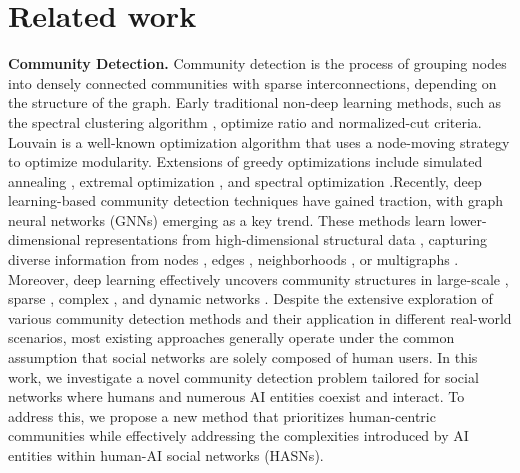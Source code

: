 \section{Related work}
\label{sec:related_work}

\noindent\textbf{Community Detection.} Community detection is the process of grouping nodes into densely connected communities with sparse interconnections, depending on the structure of the graph. Early traditional non-deep learning methods, such as the spectral clustering algorithm \cite{amini2013pseudo}, optimize ratio and normalized-cut criteria. Louvain \cite{blondel2008fast} is a well-known optimization algorithm that uses a node-moving strategy to optimize modularity. Extensions of greedy optimizations include simulated annealing \cite{kirkpatrick1983optimization}, extremal optimization \cite{boettcher2002optimization}, and spectral optimization \cite{newman2013spectral}.Recently, deep learning-based community detection techniques \cite{su2022comprehensive}\cite{lecun2015deep} have gained traction, with graph neural networks (GNNs) emerging as a key trend. These methods learn lower-dimensional representations from high-dimensional structural data \cite{khoshraftar2024survey} \cite{tsitsulin2023graph}, capturing diverse information from nodes \cite{ge2024unsupervised}, edges \cite{chikwendu2023comprehensive}, neighborhoods \cite{wang2023overview}, or multigraphs \cite{pan2021multi}. Moreover, deep learning effectively uncovers community structures in large-scale \cite{fang2020survey}, sparse \cite{wu2020deep}, complex \cite{shao2024distributed}, and dynamic networks \cite{pan2024identification}. Despite the extensive exploration of various community detection methods and their application in different real-world scenarios, most existing approaches generally operate under the common assumption that social networks are solely composed of human users. In this work, we investigate a novel community detection problem tailored for social networks where humans and numerous AI entities coexist and interact. To address this, we propose a new method that prioritizes human-centric communities while effectively addressing the complexities introduced by AI entities within human-AI social networks (HASNs).

